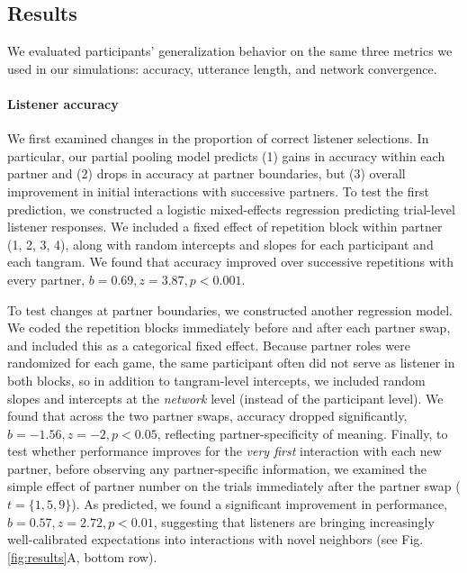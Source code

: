 \subsection{Results}


We evaluated participants' generalization behavior on the same three metrics we used in our simulations: accuracy, utterance length, and network convergence.

\paragraph{Listener accuracy}

We first examined changes in the proportion of correct listener selections.
In particular, our partial pooling model predicts (1) gains in accuracy within each partner and (2) drops in accuracy at partner boundaries, but (3) overall improvement in initial interactions with successive partners.
To test the first prediction, we constructed a logistic mixed-effects regression predicting trial-level listener responses. 
We included a fixed effect of repetition block within partner (1, 2, 3, 4), along with random intercepts and slopes for each participant and each tangram. 
We found that accuracy improved over successive repetitions with every partner, $b=0.69,z=3.87, p<0.001$.

To test changes at partner boundaries, we constructed another regression model.
We coded the repetition blocks immediately before and after each partner swap, and included this as a categorical fixed effect.
Because partner roles were randomized for each game, the same participant often did not serve as listener in both blocks, so in addition to tangram-level intercepts, we included random slopes and intercepts at the \emph{network} level (instead of the participant level).
We found that across the two partner swaps, accuracy dropped significantly, $b = -1.56, z = -2, p < 0.05$, reflecting partner-specificity of meaning.
Finally, to test whether performance improves for the \emph{very first} interaction with each new partner, before observing any partner-specific information, we examined the simple effect of partner number on the trials immediately after the partner swap ($t=\{1,5,9\}$).
As predicted, we found a significant improvement in performance, $b = 0.57, z = 2.72, p < 0.01$, suggesting that listeners are bringing increasingly well-calibrated expectations into interactions with novel neighbors (see Fig. \ref{fig:results}A, bottom row).



